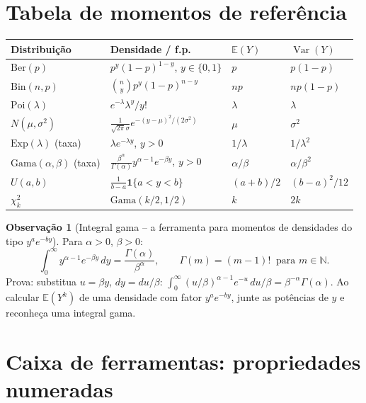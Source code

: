 \documentclass[11pt,a4paper]{article}
\theoremstyle{definition}
\newtheorem{observacao}{Observação}[section]
\theoremstyle{plain}
\newcommand{\E}{\mathbb{E}}
\newcommand{\Var}{\operatorname{Var}}
\newcommand{\ind}{\mathbf{1}}
\begin{document}
\section{Tabela de momentos de referência}\label{sec:tabela}

\begin{center}
\renewcommand{\arraystretch}{1.5}
\begin{tabular}{@{}llll@{}}
\toprule
Distribuição & Densidade / f.p. & $\E(Y)$ & $\Var(Y)$\\
\midrule
$\text{Ber}(p)$ & $p^y(1-p)^{1-y}$, $y\in\{0,1\}$ & $p$ & $p(1-p)$\\
$\text{Bin}(n,p)$ & $\binom ny p^y(1-p)^{n-y}$ & $np$ & $np(1-p)$\\
$\text{Poi}(\lambda)$ & $e^{-\lambda}\lambda^y/y!$ & $\lambda$ & $\lambda$\\
$N(\mu,\sigma^2)$ & $\frac{1}{\sqrt{2\pi}\sigma}e^{-(y-\mu)^2/(2\sigma^2)}$ & $\mu$ & $\sigma^2$\\
$\text{Exp}(\lambda)$ (taxa) & $\lambda e^{-\lambda y}$, $y>0$ & $1/\lambda$ & $1/\lambda^2$\\
$\text{Gama}(\alpha,\beta)$ (taxa) & $\frac{\beta^\alpha}{\Gamma(\alpha)}y^{\alpha-1}e^{-\beta y}$, $y>0$ & $\alpha/\beta$ & $\alpha/\beta^2$\\
$U(a,b)$ & $\frac{1}{b-a}\ind\{a<y<b\}$ & $(a+b)/2$ & $(b-a)^2/12$\\
$\chi^2_k$ & $\text{Gama}(k/2,1/2)$ & $k$ & $2k$\\
\bottomrule
\end{tabular}
\end{center}

\begin{observacao}[Integral gama -- a ferramenta para momentos de densidades do tipo $y^a e^{-by}$]
Para $\alpha>0$, $\beta>0$:
\[
\int_0^\infty y^{\alpha-1}e^{-\beta y}\,dy=\frac{\Gamma(\alpha)}{\beta^\alpha},
\qquad \Gamma(m)=(m-1)!\ \text{ para } m\in\mathbb N .
\]
Prova: substitua $u=\beta y$, $dy=du/\beta$: $\int_0^\infty (u/\beta)^{\alpha-1}e^{-u}\,du/\beta=\beta^{-\alpha}\Gamma(\alpha)$.
Ao calcular $\E(Y^k)$ de uma densidade com fator $y^a e^{-by}$, junte as potências de $y$ e reconheça uma integral gama.
\end{observacao}

\section{Caixa de ferramentas: propriedades numeradas}\label{sec:props}
\end{document}
